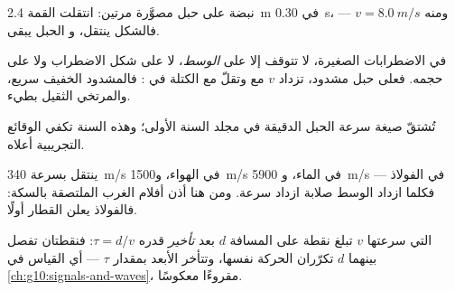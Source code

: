\begin{omfigure}

{\small نبضة على حبل مصوَّرة مرتين: انتقلت القمة \qty{2.4}{m}
في \qty{0.30}{s}، ومنه $v = \qty{8.0}{m/s}$ --- فالشكل ينتقل، و
الحبل يبقى.}
\end{omfigure}

\begin{proposition}\label{prop:g12:mechanical-waves:medium}
في الاضطرابات الصغيرة، لا تتوقف  إلا على
\emph{الوسط}، لا على شكل الاضطراب ولا على حجمه. فعلى
حبل مشدود، تزداد $v$ مع  وتقلّ مع الكتلة في
: فالمشدود الخفيف سريع، والمرتخي الثقيل بطيء. \admitted
\end{proposition}

\begin{remark}\label{rem:g12:mechanical-waves:ropeformula}
تُشتقّ صيغة سرعة الحبل الدقيقة في مجلد السنة الأولى؛ وهذه
السنة تكفي الوقائع التجريبية أعلاه.
\end{remark}

\begin{example}\label{ex:g12:mechanical-waves:speeds}
ينتقل  بسرعة \qty{340}{m/s} في الهواء، و\qty{1500}{m/s} في الماء، و
\qty{5900}{m/s} في الفولاذ --- فكلما ازداد الوسط صلابة ازداد سرعة. ومن هنا
أذن أفلام الغرب الملتصقة بالسكة: فالفولاذ يعلن القطار أولًا.
\end{example}

\begin{definition}[التأخير]\label{def:g12:mechanical-waves:delay}
 التي سرعتها $v$ تبلغ نقطة على المسافة $d$ بعد
\emph{تأخير} قدره $\tau = d/v$: فنقطتان تفصل بينهما $d$
تكرّران الحركة نفسها، وتتأخر الأبعد بمقدار $\tau$ --- أي
القياس  في \cref{ch:g10:signals-and-waves}، مقروءًا معكوسًا.
\end{definition}

